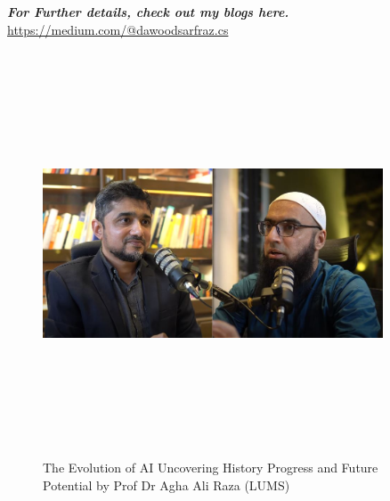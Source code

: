 \documentclass[a4paper,12pt]{article}
\begin{document}
\textbf{\textit{For Further details, check out my blogs here.}} \href{https://medium.com/@dawoodsarfraz.cs}{https://medium.com/@dawoodsarfraz.cs}
\newpage
\vspace*{1cm} %
\begin{figure}[h]
	\centering
	\vspace{-10pt} %
	\includegraphics[width=0.9\textwidth, height=12cm, keepaspectratio]{../Talks Blogs/The Evolution of AI Uncovering History Progress and Future Potential ft Prof Dr Agha Ali Raza}
	\vspace{-5pt} %
	\caption{The Evolution of AI Uncovering History Progress and Future Potential by \newline Prof Dr Agha Ali Raza (LUMS)}
	\vspace{-10pt}
\end{figure}
\end{document}

